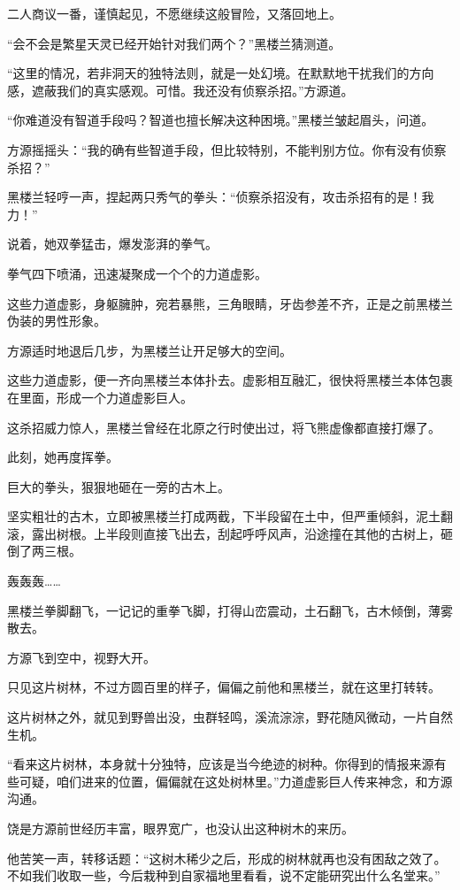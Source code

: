 \begin{this_body}
二人商议一番，谨慎起见，不愿继续这般冒险，又落回地上。

“会不会是繁星天灵已经开始针对我们两个？”黑楼兰猜测道。

“这里的情况，若非洞天的独特法则，就是一处幻境。在默默地干扰我们的方向感，遮蔽我们的真实感观。可惜。我还没有侦察杀招。”方源道。

“你难道没有智道手段吗？智道也擅长解决这种困境。”黑楼兰皱起眉头，问道。

方源摇摇头：“我的确有些智道手段，但比较特别，不能判别方位。你有没有侦察杀招？”

黑楼兰轻哼一声，捏起两只秀气的拳头：“侦察杀招没有，攻击杀招有的是！我力！”

说着，她双拳猛击，爆发澎湃的拳气。

拳气四下喷涌，迅速凝聚成一个个的力道虚影。

这些力道虚影，身躯臃肿，宛若暴熊，三角眼睛，牙齿参差不齐，正是之前黑楼兰伪装的男性形象。

方源适时地退后几步，为黑楼兰让开足够大的空间。

这些力道虚影，便一齐向黑楼兰本体扑去。虚影相互融汇，很快将黑楼兰本体包裹在里面，形成一个力道虚影巨人。

这杀招威力惊人，黑楼兰曾经在北原之行时使出过，将飞熊虚像都直接打爆了。

此刻，她再度挥拳。

巨大的拳头，狠狠地砸在一旁的古木上。

坚实粗壮的古木，立即被黑楼兰打成两截，下半段留在土中，但严重倾斜，泥土翻滚，露出树根。上半段则直接飞出去，刮起呼呼风声，沿途撞在其他的古树上，砸倒了两三根。

轰轰轰……

黑楼兰拳脚翻飞，一记记的重拳飞脚，打得山峦震动，土石翻飞，古木倾倒，薄雾散去。

方源飞到空中，视野大开。

只见这片树林，不过方圆百里的样子，偏偏之前他和黑楼兰，就在这里打转转。

这片树林之外，就见到野兽出没，虫群轻鸣，溪流淙淙，野花随风微动，一片自然生机。

“看来这片树林，本身就十分独特，应该是当今绝迹的树种。你得到的情报来源有些可疑，咱们进来的位置，偏偏就在这处树林里。”力道虚影巨人传来神念，和方源沟通。

饶是方源前世经历丰富，眼界宽广，也没认出这种树木的来历。

他苦笑一声，转移话题：“这树木稀少之后，形成的树林就再也没有困敌之效了。不如我们收取一些，今后栽种到自家福地里看看，说不定能研究出什么名堂来。”


\end{this_body}
